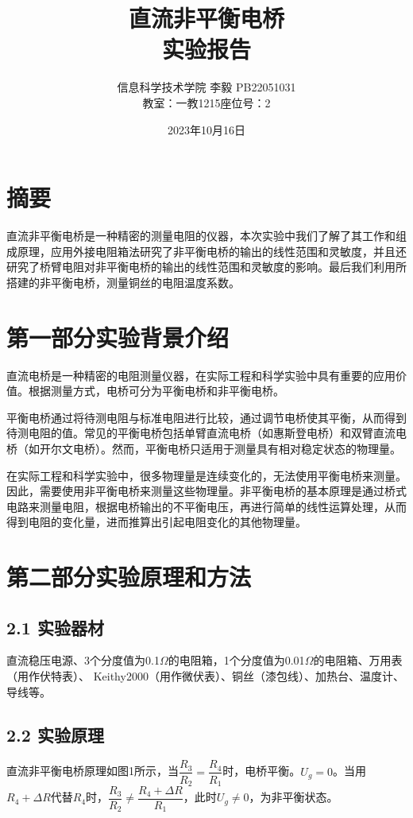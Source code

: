 \documentclass{ctexart}
\title{\Large 直流非平衡电桥\\{\large 实验报告}}
\author{\large  信息科学技术学院 \quad 李毅 PB22051031 \\{教室：一教1215\quad 座位号：2}}
\date{2023年10月16日}
\begin{document}
	\maketitle
    \newpage
    \section*{摘\quad 要}
    直流非平衡电桥是一种精密的测量电阻的仪器，本次实验中我们了解了其工作和组成原理，应用外接电阻箱法研究了非平衡电桥的输出的线性范围和灵敏度，并且还研究了桥臂电阻对非平衡电桥的输出的线性范围和灵敏度的影响。最后我们利用所搭建的非平衡电桥，测量铜丝的电阻温度系数。

    \section*{第一部分\quad 实验背景介绍}
    直流电桥是一种精密的电阻测量仪器，在实际工程和科学实验中具有重要的应用价值。根据测量方式，电桥可分为平衡电桥和非平衡电桥。

    平衡电桥通过将待测电阻与标准电阻进行比较，通过调节电桥使其平衡，从而得到待测电阻的值。常见的平衡电桥包括单臂直流电桥（如惠斯登电桥）和双臂直流电桥（如开尔文电桥）。然而，平衡电桥只适用于测量具有相对稳定状态的物理量。

    在实际工程和科学实验中，很多物理量是连续变化的，无法使用平衡电桥来测量。因此，需要使用非平衡电桥来测量这些物理量。非平衡电桥的基本原理是通过桥式电路来测量电阻，根据电桥输出的不平衡电压，再进行简单的线性运算处理，从而得到电阻的变化量，进而推算出引起电阻变化的其他物理量。

    \section*{第二部分\quad 实验原理和方法}
    \subsection*{2.1 \quad 实验器材}
    直流稳压电源、3个分度值为0.1$\Omega$的电阻箱，1个分度值为0.01$\Omega$的电阻箱、万用表（用作伏特表）、 Keithy2000（用作微伏表）、铜丝（漆包线）、加热台、温度计、导线等。

    \subsection*{2.2 \quad 实验原理}
    直流非平衡电桥原理如图1所示，当$\dfrac{R_3}{R_2}=\dfrac{R_4}{R_1}$时，电桥平衡。$U_g=0$。当用$R_4+ \Delta R$代替$R_4$时，$\dfrac{R_3}{R_2} \neq \dfrac{R_4+ \Delta R}{R_1}$，此时$U_g \neq 0$，为非平衡状态。
\end{document}
